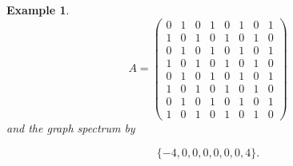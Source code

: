 \documentclass[12pt]{article}
\newtheorem{example}[theorem]{Example}
\begin{document}
\begin{example}
\[
A =
\left(\begin{array}{rrrrrrrr}
0 & 1 & 0 & 1 & 0 & 1 & 0 & 1 \\
1 & 0 & 1 & 0 & 1 & 0 & 1 & 0 \\
0 & 1 & 0 & 1 & 0 & 1 & 0 & 1 \\
1 & 0 & 1 & 0 & 1 & 0 & 1 & 0 \\
0 & 1 & 0 & 1 & 0 & 1 & 0 & 1 \\
1 & 0 & 1 & 0 & 1 & 0 & 1 & 0 \\
0 & 1 & 0 & 1 & 0 & 1 & 0 & 1 \\
1 & 0 & 1 & 0 & 1 & 0 & 1 & 0
\end{array}\right)
\]
and the graph spectrum by

\[
\{-4, 0, 0, 0, 0, 0, 0, 4\}.
\]

\end{example}
\end{document}
